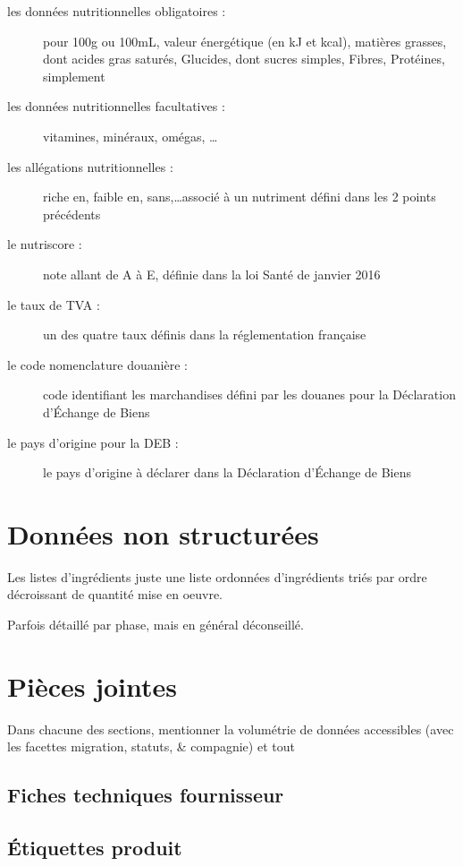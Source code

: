 \begin{description}
            \item[les données nutritionnelles obligatoires :] pour 100g ou 100mL, valeur énergétique (en kJ et kcal), matières grasses, dont acides gras saturés, Glucides, dont sucres simples, Fibres, Protéines, simplement
            \item[les données nutritionnelles facultatives :] vitamines, minéraux, omégas, \dots
            \item[les allégations nutritionnelles :] riche en, faible en, sans,\dots associé à un nutriment défini dans les 2 points précédents
            \item[le nutriscore :] note allant de A à E, définie dans la loi Santé de janvier 2016
            \item[le taux de TVA :] un des quatre taux définis dans la réglementation française
            \item[le code nomenclature douanière :] code identifiant les marchandises défini par les douanes pour la Déclaration d'\'{E}change de Biens\cite{notions_DEB}
            \item[le pays d'origine pour la DEB :] le pays d'origine à déclarer dans la Déclaration d'\'{E}change de Biens\cite{notions_DEB}
            \item[] 
        \end{description}
        
        
        \section{Données non structurées}
        
        Les listes d'ingrédients juste une liste ordonnées d'ingrédients triés par ordre décroissant de quantité mise en oeuvre.

        Parfois détaillé par phase, mais en général déconseillé.
        \section{Pièces jointes}
            \label{pieces_jointes}

            Dans chacune des sections, mentionner la volumétrie de données accessibles (avec les facettes migration, statuts, \& compagnie) et tout

            \subsection{Fiches techniques fournisseur}
            \subsection{\'{E}tiquettes produit}
